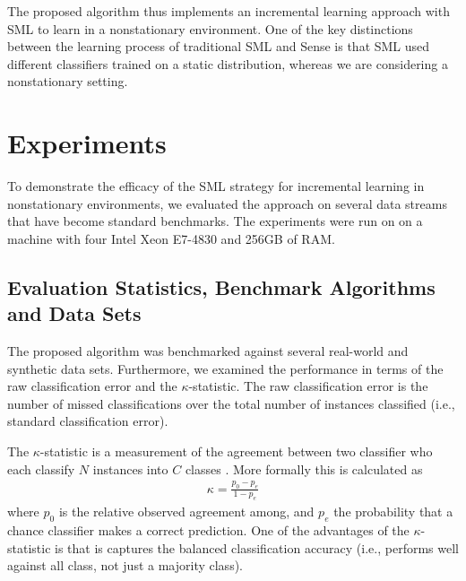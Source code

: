 \documentclass[10pt, conference]{IEEEtran}
\begin{document}
The proposed algorithm thus implements an incremental learning approach with SML to learn in a nonstationary environment. One of the key distinctions between the learning process of traditional SML and Sense is that SML used different classifiers trained on a static distribution, whereas we are considering a nonstationary setting. 


\section{Experiments}
\label{sec:exp}

To demonstrate the efficacy of the SML strategy for incremental learning in nonstationary environments, we evaluated the approach on several data streams that have become standard benchmarks.  
The experiments were run on on a machine with four Intel Xeon E7-4830 and 256GB of RAM. 



\subsection{Evaluation Statistics, Benchmark Algorithms and Data Sets}


The proposed algorithm was benchmarked against several real-world and synthetic data sets. Furthermore, we examined the performance in terms of the raw classification error and the $\kappa$-statistic. The raw classification error is the number of missed classifications over the total number of instances classified (i.e., standard classification error). 

The $\kappa$-statistic is a measurement of the agreement between two classifier who each classify $N$ instances into $C$ classes \cite{Galton1982Kappa}. More formally this is calculated as
\begin{align}
  \kappa = \frac{p_0 - p_e}{1 - p_e}
\end{align}
where $p_0$ is the relative observed agreement among, and $p_e$ the probability that a chance classifier makes a correct prediction. One of the advantages of the $\kappa$-statistic is that is captures the balanced classification accuracy (i.e., performs well against all class, not just a majority class). 
\end{document}
